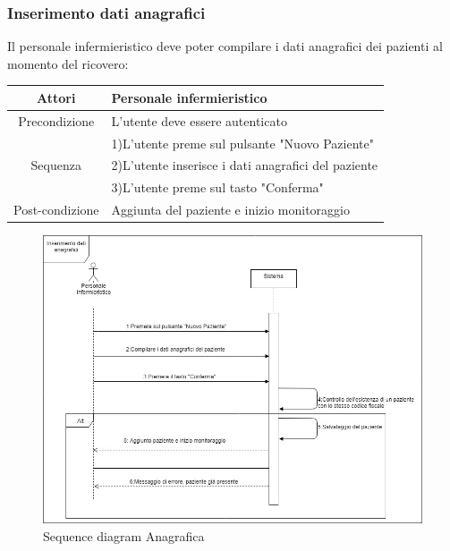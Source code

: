 \documentclass[a4paper]{report}
\begin{document}
            \subsubsection{Inserimento dati anagrafici}
                Il personale infermieristico deve poter compilare i dati anagrafici dei pazienti al momento del ricovero:
                \begin{table}[htbp]
                    \begin{tabular}{|c|l|}
                        \hline
                        Attori & Personale infermieristico \\\hline
                    Precondizione & L'utente deve essere autenticato \\\hline
                     & 1)L'utente preme sul pulsante "Nuovo Paziente" \\
                    Sequenza & 2)L'utente inserisce i dati anagrafici del paziente \\
                      & 3)L'utente preme sul tasto "Conferma" \\\hline
                    Post-condizione & Aggiunta del paziente e inizio monitoraggio  \\\hline
                    \end{tabular}
                \end{table}
                \begin{figure}[htbp]
                \centering
                \includegraphics[scale=0.4]{InsAn.jpg}
                \caption{Sequence diagram Anagrafica}
            \end{figure}
            
\end{document}
